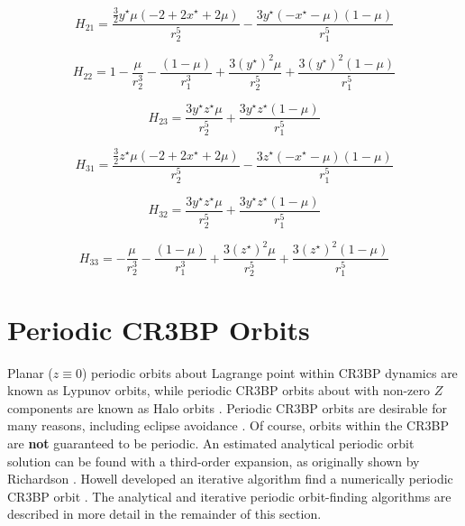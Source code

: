 \documentclass[conf]{new-aiaa}
\begin{document}
\begin{multicols}{2}
    
\begin{equation}
    H_{21} =\frac{\frac{3}{2} y^{\star} \mu \left( -2 + 2 x^{\star} + 2 \mu \right)}{r_2^{5}} - \frac{3 y^{\star} \left(  - x^{\star} - \mu \right) \left( 1 - \mu \right)}{r_1^{5}}
\end{equation}
    
    
\begin{equation}
    H_{22} =1 - \frac{\mu}{r_2^{3}} - \frac{\left( 1 - \mu \right)}{r_1^{3}} + \frac{3 \left(y^{\star}\right)^{2} \mu}{r_2^{5}} + \frac{3 \left(y^{\star}\right)^{2} \left( 1 - \mu \right)}{r_1^{5}}
\end{equation}
    
    
\begin{equation}
    H_{23} = \frac{3 y^{\star} z^{\star} \mu}{r_2^{5}} + \frac{3 y^{\star} z^{\star} \left( 1 - \mu \right)}{r_1^{5}}
\end{equation}
    
    
\begin{equation}
    H_{31} =\frac{\frac{3}{2} z^{\star} \mu \left( -2 + 2 x^{\star} + 2 \mu \right)}{r_2^{5}} - \frac{3 z^{\star} \left(  - x^{\star} - \mu \right) \left( 1 - \mu \right)}{r_1^{5}}
\end{equation}
    
    
\begin{equation}
    H_{32} =\frac{3 y^{\star} z^{\star} \mu}{r_2^{5}} + \frac{3 y^{\star} z^{\star} \left( 1 - \mu \right)}{r_1^{5}}
\end{equation}
    
    
\begin{equation}
    H_{33} = - \frac{\mu}{r_2^{3}} - \frac{\left( 1 - \mu \right)}{r_1^{3}} + \frac{3 \left(z^{\star}\right)^{2} \mu}{r_2^{5}} + \frac{3 \left(z^{\star}\right)^{2} \left( 1 - \mu \right)}{r_1^{5}}
\end{equation}

\section{Periodic CR3BP Orbits}

Planar ($z \equiv 0$) periodic orbits about Lagrange point within 
CR3BP dynamics are known as Lypunov orbits, while periodic CR3BP orbits
about with non-zero $Z$ components are known as Halo orbits 
\cite{koon2008dynamical}.
Periodic CR3BP orbits are desirable for many reasons, including
eclipse avoidance 
\cite{williams2017targeting}.
Of course, orbits within the CR3BP are \textbf{not} guaranteed to be
periodic. An estimated analytical periodic orbit solution can be found 
with a third-order expansion, as originally shown by Richardson
\cite{richardson1980analytical}
\cite{koon2008dynamical}
\cite{rund2018interplanetary}. 
Howell developed an iterative algorithm find a numerically 
periodic CR3BP orbit
\cite{howell1984three} 
\cite{koon2008dynamical} 
\cite{rund2018interplanetary}.
The analytical and iterative periodic orbit-finding algorithms 
are described in more detail in the remainder of this section.


\end{multicols}
\end{document}
